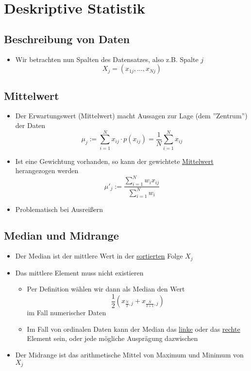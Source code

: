 \documentclass{scrartcl}
\begin{document}
\section{Deskriptive Statistik}

\subsection{Beschreibung von Daten}

\begin{itemize}
	\item Wir betrachten nun Spalten des Datensatzes, also z.B. Spalte $ j $
	\[ X_j = (x_{1j},\ldots,x_{Nj}) \]
\end{itemize}

\subsection{Mittelwert}

\begin{itemize}
	\item Der Erwartungswert (Mittelwert) macht Aussagen zur Lage (dem 
	''Zentrum'') der Daten
	\[ \mu_j := \sum_{i=1}^{N} x_{ij} \cdot p(x_{ij}) = \frac{1}{N} 
	\sum_{i=1}^{N} x_{ij} \]
	\item Ist eine Gewichtung vorhanden, so kann der gewichtete 
	\underline{Mittelwert} herangezogen werden
	\[ \mu'_j := \frac{\sum_{i=1}^{N} w_i x_{ij}}{\sum_{i=1}^{N} w_i} \]
	\item Problematisch bei Ausreißern
\end{itemize}

\subsection{Median und Midrange}

\begin{itemize}
	\item Der Median ist der mittlere Wert in der \underline{sortierten} Folge 
	$ X_j $
	\item Das mittlere Element muss nicht existieren
	\begin{itemize}
		\item Per Definition wählen wir dann als Median den Wert
		\[ \frac{1}{2} (x_{\frac{N}{2},j} + x_{\frac{N}{2+1},j}) \]
		im Fall numerischer Daten
		\item Im Fall von ordinalen Daten kann der Median das \underline{linke} 
		oder das \underline{rechte} Element sein, oder jede mögliche Ausprägung 
		dazwischen
	\end{itemize}
	\item Der Midrange ist das arithmetische Mittel von Maximum und Minimum von 
	$ X_j $
\end{itemize}
\end{document}

